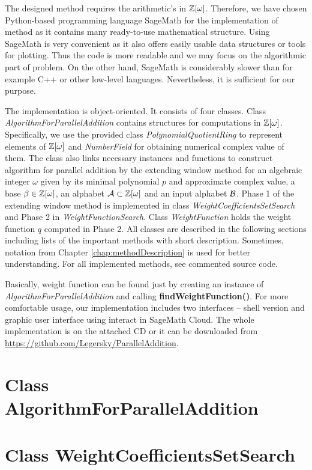 The designed method requires the arithmetic's in $\mathbb{Z}[\omega]$. Therefore, we have chosen Python-based programming language SageMath for the implementation of method as it contains many ready-to-use mathematical structure.  Using SageMath is very convenient as it also offers easily usable data structures or tools for plotting. Thus the code is more readable and we may focus on the algorithmic part of problem. On the other hand, SageMath is considerably slower than for example C++ or other low-level languages. Nevertheless, it is sufficient for our purpose.

The implementation is object-oriented. It consists of four classes. Class \emph{AlgorithmForParallelAddition} contains structures for computations in $\mathbb{Z}[\omega]$. Specifically, we use the provided class \emph{PolynomialQuotientRing} to represent elements of $\mathbb{Z}[\omega]$ and  \emph{NumberField} for obtaining numerical complex value of them. The class also links necessary instances and functions to construct algorithm for parallel addition by the extending window method for an algebraic integer $\omega$ given by its minimal polynomial $p$ and approximate complex value, a base $\beta\in\mathbb{Z}[\omega]$, an alphabet $\mathcal{A}\subset\mathbb{Z}[\omega]$ and an input alphabet $\mathcal{B}$. Phase 1 of the extending window method is implemented in class \emph{WeightCoefficientsSetSearch} and Phase 2 in \emph{WeightFunctionSearch}. Class \emph{WeightFunction} holds the weight function $q$ computed in Phase 2. All classes are described in the following sections including lists of the important methods  with short description. Sometimes, notation from Chapter \ref{chap:methodDescription} is used for better understanding. For all implemented methods, see commented source code.  

Basically, weight function can be found just by creating an instance of \emph{AlgorithmForParallelAddition} and calling \textbf{findWeightFunction()}. For more comfortable usage, our implementation includes two interfaces -- shell version and graphic user interface using interact in SageMath Cloud. The whole implementation is on the attached CD or it can be downloaded from  \url{https://github.com/Legersky/ParallelAddition}.

\section{Class AlgorithmForParallelAddition}



\section{Class WeightCoefficientsSetSearch}



